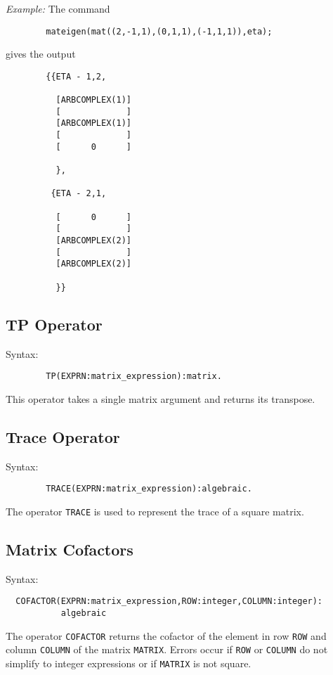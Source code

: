{\it Example:}
 The command
\begin{verbatim}
        mateigen(mat((2,-1,1),(0,1,1),(-1,1,1)),eta);
\end{verbatim}
gives the output
\begin{verbatim}
        {{ETA - 1,2,

          [ARBCOMPLEX(1)]
          [             ]
          [ARBCOMPLEX(1)]
          [             ]
          [      0      ]

          },

         {ETA - 2,1,

          [      0      ]
          [             ]
          [ARBCOMPLEX(2)]
          [             ]
          [ARBCOMPLEX(2)]

          }}
\end{verbatim}

\subsection{TP Operator} 
Syntax:
\begin{verbatim}
        TP(EXPRN:matrix_expression):matrix.
\end{verbatim}

This operator takes a single matrix argument and returns its transpose.

\subsection{Trace Operator} 
Syntax:
\begin{verbatim}
        TRACE(EXPRN:matrix_expression):algebraic.
\end{verbatim}
The operator {\tt TRACE} is used to represent the trace of a square matrix.

\subsection{Matrix Cofactors} 
Syntax:
\begin{verbatim}
  COFACTOR(EXPRN:matrix_expression,ROW:integer,COLUMN:integer):
           algebraic
\end{verbatim}

The operator {\tt COFACTOR} returns the cofactor of the element in row
{\tt ROW} and column {\tt COLUMN} of the matrix {\tt MATRIX}.  Errors occur
if {\tt ROW} or {\tt COLUMN} do not simplify to integer expressions or if
{\tt MATRIX} is not square.


